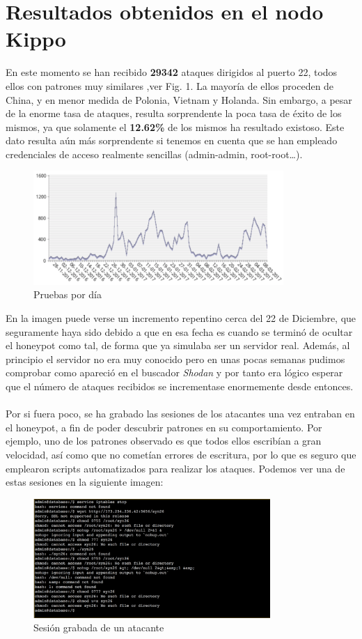 \documentclass[journal]{IEEEtran}
\begin{document}
\section{Resultados obtenidos en el nodo Kippo}
En este momento se han recibido \textbf{29342} ataques dirigidos al puerto 22, todos ellos con patrones muy similares ,ver Fig. 1. La mayoría de ellos proceden de China, y en menor medida de Polonia, Vietnam y Holanda. Sin embargo, a pesar de la enorme tasa de ataques, resulta sorprendente la poca tasa de éxito de los mismos, ya que solamente el \textbf{12.62\%} de los mismos ha resultado existoso. Este dato resulta aún más sorprendente si tenemos en cuenta que se han empleado credenciales de acceso realmente sencillas (admin-admin, root-root…).
\begin{figure}[H]
\centerline{
\includegraphics[width=9.5cm]{img/pruebas_dia}
}
\caption{Pruebas por día}
\label{fig:pruebas_diarias}
\end{figure}
En la imagen puede verse un incremento repentino cerca del 22 de Diciembre, que seguramente haya sido debido a que en esa fecha es cuando se terminó de ocultar el honeypot como tal, de forma que ya simulaba ser un servidor real. Además, al principio el servidor no era muy conocido pero en unas pocas semanas pudimos comprobar como apareció en el buscador \textit{Shodan} y por tanto era lógico esperar que el número de ataques recibidos se incrementase enormemente desde entonces.
\\\\
Por si fuera poco, se ha grabado las sesiones de los atacantes una vez entraban en el honeypot, a fin de poder descubrir patrones en su comportamiento. Por ejemplo, uno de los patrones observado es que todos ellos escribían a gran velocidad, así como que no cometían errores de escritura, por lo que es seguro que emplearon scripts automatizados para realizar los ataques. Podemos ver una de estas sesiones en la siguiente imagen:
\begin{figure}[H]
\centerline{
\includegraphics[width=9cm]{img/session}
}
\caption{Sesión grabada de un atacante}
\label{fig:sesion_atacante}
\end{figure}
\end{document}
